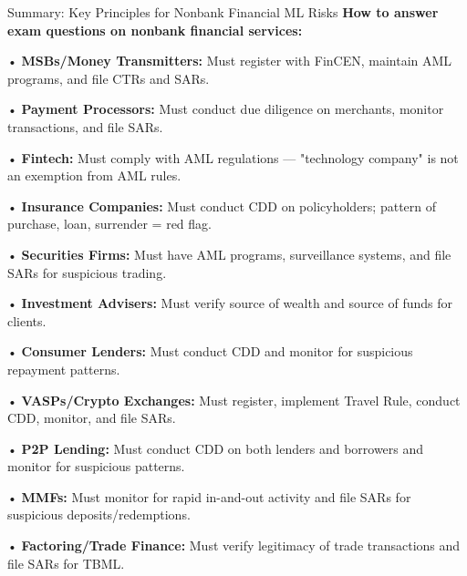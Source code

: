 \documentclass[11pt,a4paper]{beamer}
\begin{document}
\begin{frame}{Summary: Key Principles for Nonbank Financial ML Risks}
\tiny
\noindent\textbf{How to answer exam questions on nonbank financial services:}

\vspace{0.1cm}
\noindent• \textbf{MSBs/Money Transmitters:} Must register with FinCEN, maintain AML programs, and file CTRs and SARs.

\vspace{0.1cm}
\noindent• \textbf{Payment Processors:} Must conduct due diligence on merchants, monitor transactions, and file SARs.

\vspace{0.1cm}
\noindent• \textbf{Fintech:} Must comply with AML regulations — "technology company" is not an exemption from AML rules.

\vspace{0.1cm}
\noindent• \textbf{Insurance Companies:} Must conduct CDD on policyholders; pattern of purchase, loan, surrender = red flag.

\vspace{0.1cm}
\noindent• \textbf{Securities Firms:} Must have AML programs, surveillance systems, and file SARs for suspicious trading.

\vspace{0.1cm}
\noindent• \textbf{Investment Advisers:} Must verify source of wealth and source of funds for clients.

\vspace{0.1cm}
\noindent• \textbf{Consumer Lenders:} Must conduct CDD and monitor for suspicious repayment patterns.

\vspace{0.1cm}
\noindent• \textbf{VASPs/Crypto Exchanges:} Must register, implement Travel Rule, conduct CDD, monitor, and file SARs.

\vspace{0.1cm}
\noindent• \textbf{P2P Lending:} Must conduct CDD on both lenders and borrowers and monitor for suspicious patterns.

\vspace{0.1cm}
\noindent• \textbf{MMFs:} Must monitor for rapid in-and-out activity and file SARs for suspicious deposits/redemptions.

\vspace{0.1cm}
\noindent• \textbf{Factoring/Trade Finance:} Must verify legitimacy of trade transactions and file SARs for TBML.


\end{frame}
\end{document}
